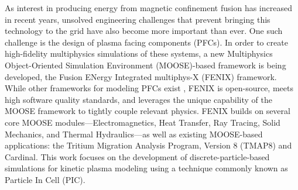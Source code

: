 {
As interest in producing energy from magnetic confinement fusion has increased in recent years, unsolved engineering challenges that prevent bringing this technology to the grid have also become more important than ever. One such challenge is the design of plasma facing components (PFCs). In order to create high-fidelity multiphysics simulations of these systems, a new Multiphysics Object-Oriented Simulation Environment (MOOSE)-based framework is being developed, the Fusion ENergy Integrated multiphys-X (FENIX) framework. While other frameworks for modeling PFCs exist \cite{badalassi2023fermi,bonnin2016presentation,candy2017atom,sircar2022fermi}, FENIX is open-source, meets high software quality standards, and leverages the unique capability of the MOOSE framework to tightly couple relevant physics. FENIX builds on several core MOOSE modules---Electromagnetics, Heat Transfer, Ray Tracing, Solid Mechanics, and Thermal Hydraulics---as well as existing MOOSE-based applications: the Tritium Migration Analysis Program, Version 8 (TMAP8) and Cardinal. This work focuses on the development of discrete-particle-based simulations for kinetic plasma modeling using a technique commonly known as Particle In Cell (PIC).
}
    
{
\begin{figure}[H]
\end{figure}
}    
